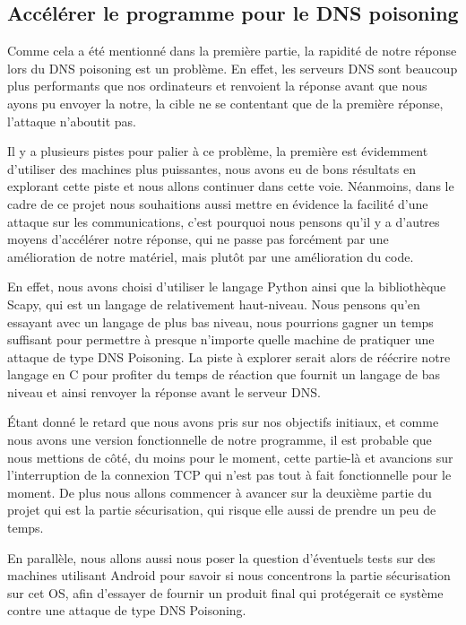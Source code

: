\documentclass[a4paper, 12pt,twoside]{article}
\begin{document}
    \subsection{Accélérer le programme pour le DNS poisoning}
    
    Comme cela a été mentionné dans la première partie, la rapidité de notre réponse lors du DNS poisoning est un problème.
En effet, les serveurs DNS sont beaucoup plus performants que nos ordinateurs et renvoient la réponse avant que nous ayons pu envoyer la notre, la cible ne se contentant que de la première réponse, l'attaque n'aboutit pas.

    Il y a plusieurs pistes pour palier à ce problème, la première est évidemment d'utiliser des machines plus puissantes, nous avons eu de bons résultats en explorant cette piste et nous allons continuer dans cette voie. Néanmoins, dans le cadre de ce projet nous souhaitions aussi mettre en évidence la facilité d'une attaque sur les communications, c'est pourquoi nous pensons qu'il y a d'autres moyens d'accélérer notre réponse, qui ne passe pas forcément par une amélioration de notre matériel, mais plutôt par une amélioration du code.

    En effet, nous avons choisi d'utiliser le langage Python ainsi que la bibliothèque Scapy, qui est un langage de relativement haut-niveau. Nous pensons qu'en essayant avec un langage de plus bas niveau, nous pourrions gagner un temps suffisant pour permettre à presque n'importe quelle machine de pratiquer une attaque de type DNS Poisoning. La piste à explorer serait alors de réécrire notre langage en C pour profiter du temps de réaction que fournit un langage de bas niveau et ainsi renvoyer la réponse avant le serveur DNS.

    Étant donné le retard que nous avons pris sur nos objectifs initiaux, et comme nous avons une version fonctionnelle de notre programme, il est probable que nous mettions de côté, du moins pour le moment, cette partie-là et avancions sur l'interruption de la connexion TCP qui n'est pas tout à fait fonctionnelle pour le moment.
    De plus nous allons commencer à avancer sur la deuxième partie du projet qui est la partie sécurisation, qui risque elle aussi de prendre un peu de temps.

    En parallèle, nous allons aussi nous poser la question d'éventuels tests sur des machines utilisant Android pour savoir si nous concentrons la partie sécurisation sur cet OS, afin d'essayer de fournir un produit final qui protégerait ce système contre une attaque de type DNS Poisoning.
\end{document}

